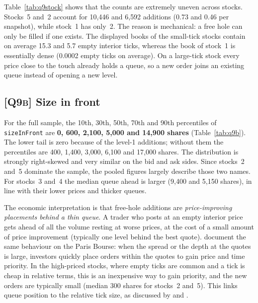 \documentclass[11pt,a4paper]{article}
\newcommand{\Q}[1]{\textsc{[Q#1]}}
\newcommand{\code}[1]{\texttt{#1}}
\begin{document}
\begin{table}[H]
\centering\small
\caption{Free-hole additions by stock. ``Mean holes in book'' is the average number of empty tick
prices strictly inside the displayed five levels (both sides combined).}
\label{tab:q9stock}
\begin{adjustbox}{max width=\textwidth}

\end{adjustbox}
\end{table}

Table~\ref{tab:q9stock} shows that the counts are extremely uneven across stocks. Stocks~5 and~2
account for 10{,}446 and 6{,}592 additions (0.73 and 0.46 per snapshot), while stock~1 has only~2.
The reason is mechanical: a free hole can only be filled if one exists. The displayed books of the
small-tick stocks contain on average 15.3 and 5.7 empty interior ticks, whereas the book of stock~1
is essentially dense (0.0002 empty ticks on average). On a large-tick stock every price close to the
touch already holds a queue, so a new order joins an existing queue instead of opening a new level.

\subsection*{\Q{9b} Size in front}

\begin{table}[H]
\centering\small
\caption{\Q{9b} Percentiles of \code{sizeInFront} (shares). The stock~1 row is based on two
events and is reported only for completeness.}
\label{tab:q9b}

\end{table}

For the full sample, the 10th, 30th, 50th, 70th and 90th percentiles of \code{sizeInFront} are
\textbf{0, 600, 2{,}100, 5{,}000 and 14{,}900 shares} (Table~\ref{tab:q9b}). The lower tail is zero
because of the level-1 additions; without them the percentiles are 400, 1{,}400, 3{,}000, 6{,}100
and 17{,}000 shares. The distribution is strongly right-skewed and very similar on the bid and ask
sides. Since stocks~2 and~5 dominate the sample, the pooled figures largely describe those two
names. For stocks~3 and~4 the median queue ahead is larger (9{,}400 and 5{,}150 shares), in line
with their lower prices and thicker queues.

The economic interpretation is that free-hole additions are \emph{price-improving placements
behind a thin queue}. A trader who posts at an empty interior price gets ahead of all the volume
resting at worse prices, at the cost of a small amount of price improvement (typically one level
behind the best quote). \citet{biais1995} document the same behaviour on the Paris Bourse: when the spread or the depth
at the quotes is large, investors quickly place orders within the quotes to gain price and time
priority. In the high-priced stocks, where empty ticks are common and a tick is
cheap in relative terms, this is an inexpensive way to gain priority, and the new orders are
typically small (median 300 shares for stocks~2 and~5). This links queue position to the
relative tick size, as discussed by \citet{dayri2015} and \citet{bouchaud2018}.
\end{document}

